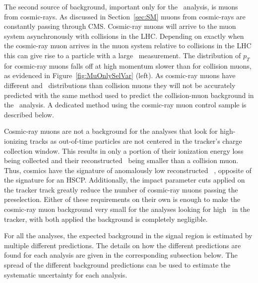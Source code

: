The second source of background, important only for the \muononly\  analysis,
is muons from cosmic-rays. 
As discussed in Section~\ref{sec:SM} muons from cosmic-rays
are constantly passing through CMS. Cosmic-ray muons will arrive to the muon system asynchronously with collisions in the LHC. Depending on exactly
when the cosmic-ray muon arrives in the muon system relative to collisions in the LHC this can give rise to a particle with a large \invbeta\ measurement.
The distribution of $p_T$ for cosmic-ray muons falls off at high momentum slower than for collision muons, as evidenced in Figure~\ref{fig:MuOnlySelVar} (left).
As cosmic-ray muons have different \invbeta and \pt\ distributions than collision muons they will not be accurately predicted with the same method used to predict
the collision-muon background in the \muononly\ analysis. A dedicated method using the cosmic-ray muon control sample is described below.

Cosmic-ray muons are not a background for the analyses that look for high-ionizing tracks as
out-of-time particles are not centered in the tracker's charge collection window.
This results in only a portion of their ionization energy loss being collected and their reconstructed \dedx\ being smaller than a collision muon.
Thus, cosmics have the signature of anomalously low reconstructed \dedx~\cite{CMS:2012xi}, opposite of the signature for an HSCP.
Additionally, the impact parameter cuts applied on the tracker track greatly reduce the number of cosmic-ray muons passing the preselection.
Either of these requirements on their own is enough to make the cosmic-ray muon background very small for the analyses looking for high \dedx\ in the tracker,
with both applied the background is completely negligible.

For all the analyses, the expected background in the signal region is estimated by multiple different predictions.
The details on how the different predictions are found for each analysis are given in the corresponding subsection below.
The spread of the different background predictions can be used to estimate the systematic uncertainty for each analysis.

